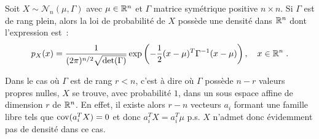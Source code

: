  \begin{proposition}\label{prop:vect_gaussiens_densite}
   Soit $X\sim\mathcal{N}_n( \mu, \Gamma)$ avec $\mu\in\mathbb{R}^n$ et $\Gamma$
   matrice sym\'etrique positive $n\times n$.  Si $\Gamma$ est de rang plein,
   alors la loi de probabilit\'e de $X$ poss\`ede une densit\'e dans $\mathbb{R}^n$ dont
   l'expression est~:
$$
 p_X(x)=\frac{1}{(2\pi)^{n/2}\sqrt{\det(\Gamma)}}
 \exp\left ( -\frac{1}{2}(x-\mu)^T \Gamma^{-1}(x-\mu) \right ),\quad x\in\mathbb{R}^n\;.
 $$
\end{proposition}
Dans le cas o\`u $\Gamma$ est de rang $r<n$, c'est \`a dire o\`u $\Gamma$ poss\`ede
 $n-r$ valeurs propres nulles, $X$ se trouve, avec probabilit\'e $1$, dans un
 sous espace affine de dimension $r$ de $\mathbb{R}^n$. En effet, il existe alors
 $r-n$ vecteurs $a_i$ formant une famille libre tels que $\mathrm{cov}(a_i^T X) =
 0$ et donc $a_i^T X=a_i^T \mu$ p.s. $X$ n'admet donc \'evidemment pas de
 densit\'e dans ce cas.

